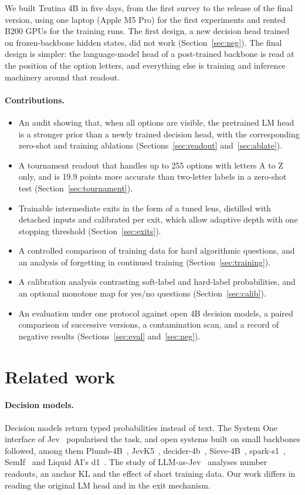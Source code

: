 \documentclass[10pt]{article}
\begin{document}
We built Trutina 4B in five days, from the first survey to the release of the final version, using one laptop (Apple M5 Pro) for the first experiments and rented B200 GPUs for the training runs.
The first design, a new decision head trained on frozen-backbone hidden states, did not work (Section~\ref{sec:neg}).
The final design is simpler: the language-model head of a post-trained backbone is read at the position of the option letters, and everything else is training and inference machinery around that readout.

\paragraph{Contributions.}
\begin{itemize}
\item An audit showing that, when all options are visible, the pretrained LM head is a stronger prior than a newly trained decision head, with the corresponding zero-shot and training ablations (Sections~\ref{sec:readout} and~\ref{sec:ablate}).
\item A tournament readout that handles up to 255 options with letters A to Z only, and is 19.9 points more accurate than two-letter labels in a zero-shot test (Section~\ref{sec:tournament}).
\item Trainable intermediate exits in the form of a tuned lens, distilled with detached inputs and calibrated per exit, which allow adaptive depth with one stopping threshold (Section~\ref{sec:exits}).
\item A controlled comparison of training data for hard algorithmic questions, and an analysis of forgetting in continued training (Section~\ref{sec:training}).
\item A calibration analysis contrasting soft-label and hard-label probabilities, and an optional monotone map for yes/no questions (Section~\ref{sec:calib}).
\item An evaluation under one protocol against open 4B decision models, a paired comparison of successive versions, a contamination scan, and a record of negative results (Sections~\ref{sec:eval} and~\ref{sec:neg}).
\end{itemize}

\section{Related work}

\paragraph{Decision models.}
Decision models return typed probabilities instead of text. The System One interface of Jev~\cite{jev} popularised the task, and open systems built on small backbones followed, among them Plumb-4B~\cite{plumb}, JevK5~\cite{jevk5}, decider-4b~\cite{decider4b}, Sieve-4B~\cite{sieve}, spark-s1~\cite{spark}, SemIf~\cite{semif} and Liquid AI's d1~\cite{d1}. The study of LLM-as-Jev~\cite{llmjev} analyses number readouts, an anchor KL and the effect of short training data. Our work differs in reading the original LM head and in the exit mechanism.
\end{document}
